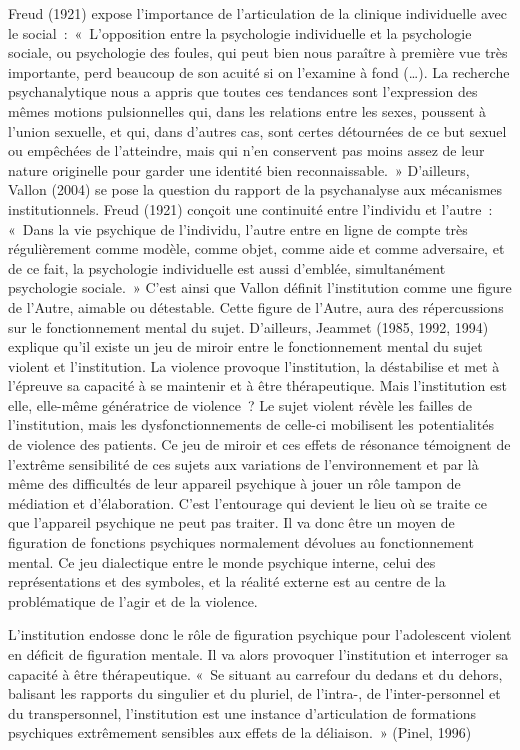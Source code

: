 \documentclass[12pt, a4paper]{book}
\begin{document}
\begin{spacing}{1.5}
Freud (1921) expose l'importance de l'articulation de la clinique individuelle avec le social : « L'opposition entre la psychologie individuelle et la psychologie sociale, ou psychologie des foules, qui peut bien nous paraître à première vue très importante, perd beaucoup de son acuité si on l'examine à fond (…). La recherche psychanalytique nous a appris que toutes ces tendances sont l'expression des mêmes motions pulsionnelles qui, dans les relations entre les sexes, poussent à l'union sexuelle, et qui, dans d'autres cas, sont certes détournées de ce but sexuel ou empêchées de l'atteindre, mais qui n'en conservent pas moins assez de leur nature originelle pour garder une identité bien reconnaissable. » D'ailleurs, Vallon (2004) se pose la question du rapport de la psychanalyse aux  mécanismes institutionnels. Freud (1921) conçoit une continuité entre l'individu et l'autre : « Dans la vie psychique de l'individu, l'autre entre en ligne de compte très régulièrement comme modèle, comme objet, comme aide et comme adversaire, et de ce fait, la psychologie individuelle est aussi d'emblée, simultanément psychologie sociale. » C'est ainsi que Vallon définit l'institution comme une figure de l'Autre, aimable ou détestable. Cette figure de l'Autre, aura des répercussions sur le fonctionnement mental du sujet. D'ailleurs, Jeammet (1985, 1992, 1994) explique qu'il existe un jeu de miroir entre le fonctionnement mental du sujet violent et l'institution. La violence provoque l'institution, la déstabilise et met à l'épreuve sa capacité à se maintenir et à être thérapeutique. Mais l'institution est elle, elle-même génératrice de violence ? Le sujet violent révèle les failles de l'institution, mais les dysfonctionnements de celle-ci mobilisent les potentialités de violence des patients. Ce jeu de miroir  et ces effets de résonance témoignent de l'extrême sensibilité de ces sujets aux variations de l'environnement et par là même des difficultés de leur appareil psychique à jouer un rôle tampon de médiation et d'élaboration. C'est l'entourage qui devient le lieu où se traite ce que l'appareil psychique ne peut pas traiter. Il va donc être un moyen de figuration de fonctions psychiques normalement dévolues au fonctionnement mental. Ce jeu dialectique entre le monde psychique interne, celui des représentations et des symboles, et la réalité externe est au centre de la problématique de l'agir et de la violence. 

L'institution endosse donc le rôle de figuration psychique pour l'adolescent violent en déficit de figuration mentale. Il va alors provoquer l'institution et interroger sa capacité à être thérapeutique. « Se situant au carrefour du dedans et du dehors, balisant les rapports du singulier et du pluriel, de l'intra-, de l'inter-personnel et du transpersonnel, l'institution est une instance d'articulation de formations psychiques extrêmement sensibles aux effets de la déliaison. » (Pinel, 1996) 


\end{spacing}
\end{document}
